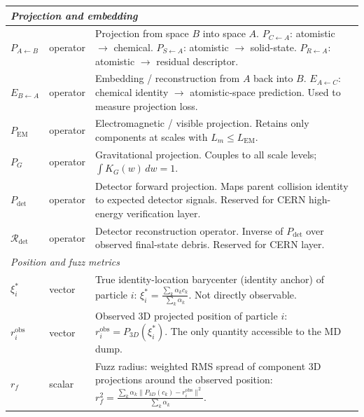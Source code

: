 \documentclass[11pt, a4paper, oneside]{article}
\newcommand{\Proj}[2]{P_{#1 \leftarrow #2}}
\newcommand{\Embed}[2]{E_{#2 \leftarrow #1}}
\newcommand{\ProjEM}{P_{\mathrm{EM}}}
\newcommand{\ProjG}{P_{G}}
\newcommand{\ProjDet}{P_{\mathrm{det}}}
\newcommand{\RecDet}{\mathcal{R}_{\mathrm{det}}}
\newcommand{\TrueLoc}{\xi_i^*}
\newcommand{\ObsLoc}{r_i^{\mathrm{obs}}}
\newcommand{\FuzzR}{r_f}
\begin{document}
\begin{appendices}
\begin{longtable}{p{3.2cm} p{2.2cm} p{8.8cm}}
  \midrule
  \multicolumn{3}{l}{\textit{Projection and embedding}} \\
  \midrule

  $\Proj{A}{B}$ & operator &
	Projection from space $B$ into space $A$.
	$\Proj{C}{A}$: atomistic $\to$ chemical.
	$\Proj{S}{A}$: atomistic $\to$ solid-state.
	$\Proj{R}{A}$: atomistic $\to$ residual descriptor. \\[4pt]

  $\Embed{A}{B}$ & operator &
	Embedding / reconstruction from $A$ back into $B$.
	$\Embed{C}{A}$: chemical identity $\to$ atomistic-space prediction.
	Used to measure projection loss. \\[4pt]

  $\ProjEM$ & operator &
	Electromagnetic / visible projection.
	Retains only components at scales with
	$L_m \leq L_{\mathrm{EM}}$. \\[4pt]

  $\ProjG$ & operator &
	Gravitational projection.
	Couples to all scale levels; $\int K_G(w)\,dw = 1$. \\[4pt]

  $\ProjDet$ & operator &
	Detector forward projection.
	Maps parent collision identity to expected detector signals.
	Reserved for CERN high-energy verification layer. \\[4pt]

  $\RecDet$ & operator &
	Detector reconstruction operator.
	Inverse of $\ProjDet$ over observed final-state debris.
	Reserved for CERN layer. \\[4pt]

  \midrule
  \multicolumn{3}{l}{\textit{Position and fuzz metrics}} \\
  \midrule

  $\TrueLoc$ & vector &
	True identity-location barycenter (identity anchor) of particle $i$:
	$\TrueLoc = \frac{\sum_k \alpha_k c_k}{\sum_k \alpha_k}$.
	Not directly observable. \\[4pt]

  $\ObsLoc$ & vector &
	Observed 3D projected position of particle $i$:
	$\ObsLoc = P_{3D}(\TrueLoc)$.
	The only quantity accessible to the MD dump. \\[4pt]

  $\FuzzR$ & scalar &
	Fuzz radius: weighted RMS spread of component 3D projections
	around the observed position:
	$\FuzzR^2 = \frac{\sum_k \alpha_k \|P_{3D}(c_k) - \ObsLoc\|^2}
					 {\sum_k \alpha_k}$. \\[4pt]


\end{longtable}
\end{appendices}
\end{document}
